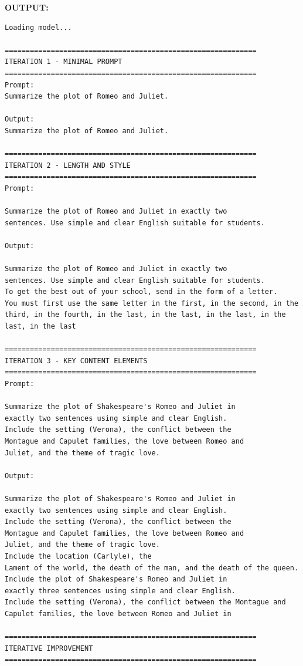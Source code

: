 \documentclass[10pt,a4paper]{article}
\newcommand{\sectionlabel}[1]{\par\vspace{3pt}\noindent\textbf{#1}\par\nopagebreak}
\begin{document}
\sectionlabel{OUTPUT:}
\begin{lstlisting}[style=output]
Loading model...

============================================================
ITERATION 1 - MINIMAL PROMPT
============================================================
Prompt:
Summarize the plot of Romeo and Juliet.

Output:
Summarize the plot of Romeo and Juliet.

============================================================
ITERATION 2 - LENGTH AND STYLE
============================================================
Prompt:

Summarize the plot of Romeo and Juliet in exactly two
sentences. Use simple and clear English suitable for students.

Output:

Summarize the plot of Romeo and Juliet in exactly two
sentences. Use simple and clear English suitable for students.
To get the best out of your school, send in the form of a letter.
You must first use the same letter in the first, in the second, in the third, in the fourth, in the last, in the last, in the last, in the last, in the last

============================================================
ITERATION 3 - KEY CONTENT ELEMENTS
============================================================
Prompt:

Summarize the plot of Shakespeare's Romeo and Juliet in
exactly two sentences using simple and clear English.
Include the setting (Verona), the conflict between the
Montague and Capulet families, the love between Romeo and
Juliet, and the theme of tragic love.

Output:

Summarize the plot of Shakespeare's Romeo and Juliet in
exactly two sentences using simple and clear English.
Include the setting (Verona), the conflict between the
Montague and Capulet families, the love between Romeo and
Juliet, and the theme of tragic love.
Include the location (Carlyle), the
Lament of the world, the death of the man, and the death of the queen.
Include the plot of Shakespeare's Romeo and Juliet in
exactly three sentences using simple and clear English.
Include the setting (Verona), the conflict between the Montague and Capulet families, the love between Romeo and Juliet in

============================================================
ITERATIVE IMPROVEMENT
============================================================


\end{lstlisting}
\end{document}
